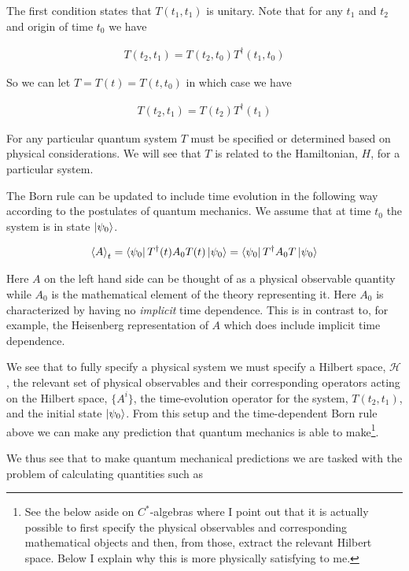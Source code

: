 \documentclass[12pt]{article}
\begin{document}
The first condition states that $T(t_1, t_1)$ is unitary.
Note that for any $t_1$ and $t_2$ and origin of time $t_0$ we have

\begin{align}
T(t_2, t_1) = T(t_2, t_0)T^{\dag}(t_1, t_0)
\end{align}

So we can let $T = T(t) = T(t, t_0)$ in which case we have

\begin{align}
T(t_2, t_1) = T(t_2)T^{\dag}(t_1)
\end{align}

For any particular quantum system $T$ must be specified or determined based on physical considerations. We will see that $T$ is related to the Hamiltonian, $H$, for a particular system.

The Born rule can be updated to include time evolution in the following way according to the postulates of quantum mechanics. We assume that at time $t_0$ the system is in state $\ket{\psi_0}$.

\begin{align}
\Braket{A}_t = \bra{\psi_0} T^{\dag}(t) A_0 T(t) \ket{\psi_0} = \bra{\psi_0}T^{\dag}A_0 T\ket{\psi_0}
\end{align}

Here $A$ on the left hand side can be thought of as a physical observable quantity while $A_0$ is the mathematical element of the theory representing it.
Here $A_0$ is characterized by having no \textit{implicit} time dependence.
This is in contrast to, for example, the Heisenberg representation of $A$ which does include implicit time dependence.

We see that to fully specify a physical system we must specify a Hilbert space, $\mathcal{H}$, the relevant set of physical observables and their corresponding operators acting on the Hilbert space, $\{A^i\}$, the time-evolution operator for the system, $T(t_2,t_1)$, and the initial state $\ket{\psi_0}$. From this setup and the time-dependent Born rule above we can make any prediction that quantum mechanics is able to make\footnote{See the below aside on $C^*$-algebras where I point out that it is actually possible to first specify the physical observables and corresponding mathematical objects and then, from those, extract the relevant Hilbert space. Below I explain why this is more physically satisfying to me.}.

We thus see that to make quantum mechanical predictions we are tasked with the problem of calculating quantities such as
\end{document}
